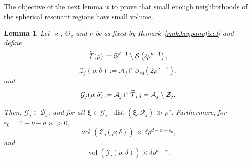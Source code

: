 \documentclass[10pt]{amsart}
\newtheorem{lemm}[theo]{Lemma}\newtheorem{prop}[theo]{Proposition}\newtheorem{coro}[theo]{Corollary}\newtheorem{conj}[theo]{Conjecture}
\theoremstyle{definition}\newtheorem{defi}[theo]{Definition}\newtheorem{rema}[theo]{Remark}\newtheorem{exam}[theo]{Example}\newtheorem{nota}[theo]{Notation}
\DeclareMathOperator{\vol}{vol}
\DeclareMathOperator{\dist}{dist}
\newcommand{\BBS}{\mathbb S}
\newcommand{\CA}{\mathcal{A}}
\newcommand{\CB}{\mathcal{B}}
\newcommand{\CG}{\mathcal{G}}
\newcommand{\CR}{\mathcal{R}}
\newcommand{\CS}{\mathcal{S}}
\newcommand{\CT}{\mathcal{T}}
\newcommand{\CZ}{\mathcal{Z}}
\newcommand{\bxi}{\boldsymbol \xi}
\newcommand{\eps}{\varepsilon}
\let\oldtilde\tilde
\renewcommand*{\tilde}[1]{\mathchoice{\widetilde{#1}}{\widetilde{#1}}{\oldtilde{#1}}{\oldtilde{#1}}}
\begin{document}
The objective of the next lemma is to prove that small enough neighborhoods of the spherical resonant regions have small volume.
\begin{lemm} \label{lem:enlargedresonant}
Let $\varkappa$, $\Theta_\varkappa$ and $\nu$ be as fixed by Remark~\ref{rmk:kappanufixed} and define
\begin{equation}
\tilde \CT(\rho) := \BBS^{d-1} \setminus \CS\left(2 \rho^{\nu-1}\right),
\end{equation}
\begin{equation}\label{eq:czjsub}
\CZ_j(\rho;\delta) := \CA_j \cap \CS_{rd}\left(2\rho^{\nu-1}\right),
\end{equation}
and
\begin{equation}\label{eq:cgjsub}
\CG_j(\rho;\delta) := \CA_j \cap \tilde \CT_{rd} = \CA_j \setminus \CZ_j.
\end{equation}

Then, $\CG_j \subset \CB_j$, and for all $\bxi \in \CG_j$, $\dist(\bxi,\CR_j)\gg
\rho^{\nu}$. Furthermore, for $\eps_0 = 1 - \nu - d \varkappa > 0$,
\begin{equation}\label{eq:volCZ}
\vol(\CZ_j(\rho;\delta)) \ll \delta \rho^{d - \alpha - \eps_0},
\end{equation}
and
\begin{equation}\label{eq:voltCG}
\vol(\CG_j(\rho;\delta)) \asymp \delta \rho^{d - \alpha}.
\end{equation}
\end{lemm}
\end{document}

